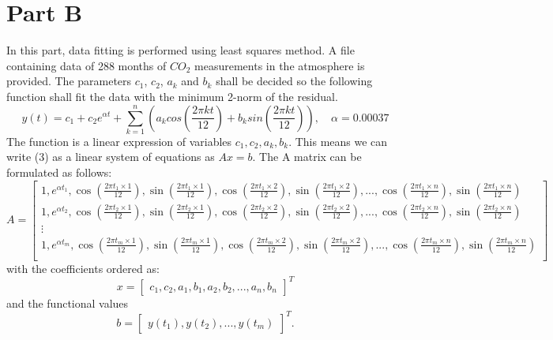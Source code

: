 \documentclass[11pt,a4paper,roman]{scrartcl}
\begin{document}
\section*{Part B}
In this part, data fitting is performed using least squares method. A file containing data of 288 months of $CO_2$ measurements in the atmosphere is provided. The parameters $c_1$, $c_2$, $a_k$ and $b_k$ shall be decided so the following function shall fit the data with the minimum 2-norm of the residual. 
\begin{equation}
y(t) = c_1 + c_2 e^{\alpha t} + \sum_{k=1}^{n}(a_k cos(\frac{2\pi k t}{12}) + b_k sin(\frac{2\pi k t}{12})), \quad \alpha = 0.00037
\end{equation}
The function is a linear expression of variables $c_1, c_2, a_k, b_k$. This means we can write (3) as a linear system of equations as $Ax = b$. The A matrix can be formulated as follows:
\begin{equation*}
A = \begin{bmatrix}
1, e^{\alpha t_1}, \cos\left(\frac{2\pi t_1\times 1}{12}\right), \sin\left(\frac{2\pi t_1\times 1}{12}\right), \cos\left(\frac{2\pi t_1\times 2}{12}\right), \sin\left(\frac{2\pi t_1\times 2}{12}\right), ... , \cos\left(\frac{2\pi t_1\times n}{12}\right), \sin\left(\frac{2\pi t_1\times n}{12}\right) \\
1, e^{\alpha t_2}, \cos\left(\frac{2\pi t_2\times 1}{12}\right), \sin\left(\frac{2\pi t_2\times 1}{12}\right), \cos\left(\frac{2\pi t_2\times 2}{12}\right), \sin\left(\frac{2\pi t_2\times 2}{12}\right), ... , \cos\left(\frac{2\pi t_2\times n}{12}\right), \sin\left(\frac{2\pi t_2\times n}{12}\right) \\
\vdots \\
1, e^{\alpha t_m}, \cos\left(\frac{2\pi t_m\times 1}{12}\right), \sin\left(\frac{2\pi t_m\times 1}{12}\right), \cos\left(\frac{2\pi t_m\times 2}{12}\right), \sin\left(\frac{2\pi t_m\times 2}{12}\right), ... , \cos\left(\frac{2\pi t_m\times n}{12}\right), \sin\left(\frac{2\pi t_m\times n}{12}\right) \\
\end{bmatrix}
\end{equation*}
with the coefficients ordered as:
\begin{equation*}
x = \begin{bmatrix} c_1, c_2, a_1, b_1, a_2, b_2, ..., a_n, b_n \end{bmatrix}^T
\end{equation*}
and the functional values
\begin{equation*}
b = \begin{bmatrix} y(t_1), y(t_2), ... ,y(t_m) \end{bmatrix}^T.
\end{equation*}
\end{document}
